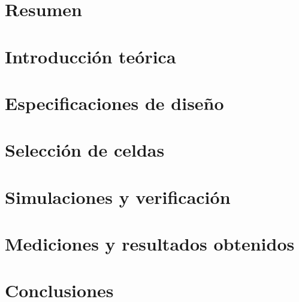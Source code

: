 \section{Resumen}

\section{Introducci\'on te\'orica}

\section{Especificaciones de dise\~no}

\section{Selecci\'on de celdas}

\section{Simulaciones y verificaci\'on}

\section{Mediciones y resultados obtenidos}

\section{Conclusiones}